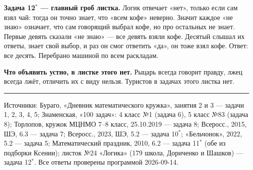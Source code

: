 \documentclass[10pt,a4paper]{article}
\begin{document}
\textbf{Задача 12$^*$ --- главный гроб листка.} Логик отвечает «нет», только если сам взял чай:
тогда он точно знает, что «всем кофе» неверно. Значит каждое «не знаю» означает, что сам
говорящий выбрал кофе, но про остальных не знает. Первые девять сказали «не знаю» --- все
девять взяли кофе. Десятый слышал их ответы, знает свой выбор, и раз он смог ответить «да»,
он тоже взял кофе. Ответ: все десять. Перебрано машиной по всем раскладам.

\vspace{3pt}
\textbf{Что объявить устно, в листке этого нет.} Рыцарь всегда говорит правду, лжец всегда
лжёт, отличить их с виду нельзя. Туристов в задачах этого листка нет.

\vspace{10pt}\hrule\vspace{5pt}
{\small Источники: Бураго, «Дневник математического кружка», занятия 2 и 3 --- задачи 1, 2, 3, 4, 5;
Знаменская, «100 задач»: 4 класс №1 (задача 6), 5 класс №83 (задача 8);
Торлопов, кружок МЦНМО 7--8 класс, 25.10.2019 --- задача 8;
Всеросс., 2015, ШЭ, 6.3 --- задача 7; Всеросс., 2023, ШЭ, 5.2 --- задача 10$^*$;
«Бельчонок», 2022, 5.2 --- задача 5; Математический праздник, 2010, 6.2 --- задача 11$^*$
(обе из подборки Ксении);
листок №24 «Логика» (179 школа, Дориченко и Шашков) --- задача 12$^*$.
Все ответы проверены программой 2026-09-14.}
\end{document}
